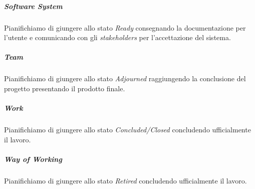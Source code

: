 	\subparagraph{Software System}
	Pianifichiamo di giungere allo stato \emph{Ready} consegnando la documentazione per l'utente e comunicando con gli \emph{stakeholders} per l'accettazione del sistema.
	
	\subparagraph{Team}
	Pianifichiamo di giungere allo stato \emph{Adjourned} raggiungendo la conclusione del progetto presentando il prodotto finale.
	
	\subparagraph{Work}
	Pianifichiamo di giungere allo stato \emph{Concluded/Closed} concludendo ufficialmente il lavoro.
	
	\subparagraph{Way of Working}
	Pianifichiamo di giungere allo stato \emph{Retired} concludendo ufficialmente il lavoro.

	\newpage